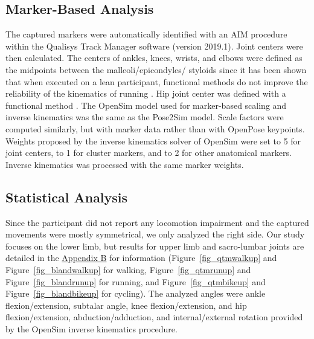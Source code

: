 \subsection{Marker-Based Analysis}

The captured markers were automatically identified with an AIM procedure within the Qualisys Track Manager software (version 2019.1). Joint centers were then calculated. The centers of ankles, knees, wrists, and elbows were defined as the midpoints between the malleoli/epicondyles/
styloids since it has been shown that when executed on a lean participant, functional methods do not improve the reliability of the kinematics of running \cite{Pohl2010}. Hip joint center was defined with a functional method \cite{Halvorsen2003}. The OpenSim model used for marker-based scaling and inverse kinematics was the same as the Pose2Sim model. Scale factors were computed similarly, but with marker data rather than with OpenPose keypoints. Weights proposed by the inverse kinematics solver of OpenSim were set to 5 for joint centers, to 1 for cluster markers, and to 2 for other anatomical markers. Inverse kinematics was processed with the same marker weights.


\subsection{Statistical Analysis} \label{stats_accuracy}

Since the participant did not report any locomotion impairment and the captured movements were mostly symmetrical, we only analyzed the right side. Our study focuses on the lower limb, but results for upper limb and sacro-lumbar joints are detailed in the \hyperref[Ann:2]{Appendix B} for information (Figure~\ref{fig_qtmwalkup} and Figure~\ref{fig_blandwalkup} for walking, Figure~\ref{fig_qtmrunup} and Figure~\ref{fig_blandrunup} for running, and Figure~\ref{fig_qtmbikeup} and Figure~\ref{fig_blandbikeup} for cycling). The analyzed angles were ankle flexion/extension, subtalar angle, knee flexion/extension, and hip flexion/extension, abduction/adduction, and internal/external rotation provided by the OpenSim inverse kinematics procedure.

